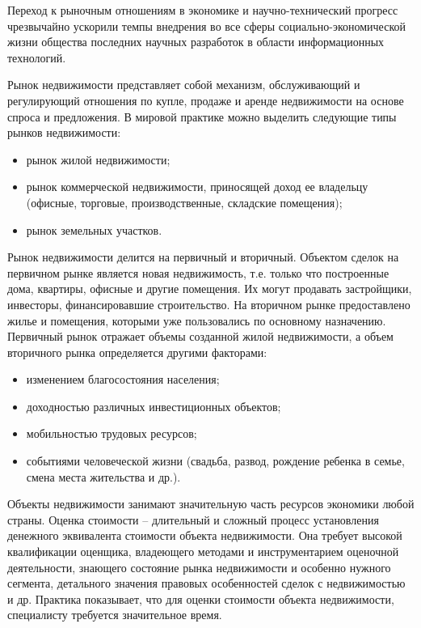 \setcounter{page}{2}


Переход к рыночным отношениям в экономике и научно-технический прогресс чрезвычайно ускорили темпы внедрения во все
сферы социально-экономической жизни общества последних научных разработок в области информационных технологий.

Рынок недвижимости представляет собой механизм, обслуживающий и регулирующий отношения по купле,
продаже и аренде недвижимости на основе спроса и предложения.
В мировой практике можно выделить следующие типы рынков недвижимости:
\begin{itemize}
	\item рынок жилой недвижимости;
	\item рынок коммерческой недвижимости, приносящей доход ее владельцу (офисные, торговые, производственные,
  складские помещения);
  \item рынок земельных участков.
\end{itemize}

Рынок недвижимости делится на первичный и вторичный. Объектом сделок на первичном рынке является
новая недвижимость, т.е. только что построенные дома, квартиры, офисные и другие помещения. Их могут продавать
застройщики, инвесторы, финансировавшие строительство. На вторичном рынке предоставлено жилье и помещения,
которыми уже пользовались по основному назначению. Первичный рынок отражает объемы созданной жилой недвижимости, а
объем вторичного рынка определяется другими факторами:
\begin{itemize}
  \item изменением благосостояния населения;
  \item доходностью различных инвестиционных объектов;
  \item мобильностью трудовых ресурсов;
  \item событиями человеческой жизни (свадьба, развод, рождение ребенка в семье, смена места жительства и др.).
\end{itemize}

Объекты недвижимости занимают значительную часть ресурсов экономики любой страны.
Оценка стоимости – длительный и сложный процесс установления денежного эквивалента стоимости объекта недвижимости.
Она требует высокой квалификации оценщика, владеющего методами и инструментарием оценочной деятельности, знающего состояние
рынка недвижимости и особенно нужного сегмента, детального значения правовых особенностей сделок с недвижимостью и др.
Практика показывает, что для оценки стоимости объекта недвижимости, специалисту требуется значительное время.

